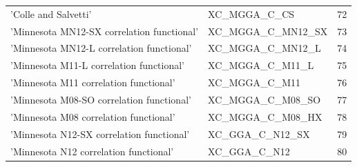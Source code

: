 \documentclass[final,12pt]{article}
\begin{document}
{{{{{{\begin{table}[!h]
\begin{center}
\begin{tabular}{llr}
  'Colle and Salvetti' & XC\_MGGA\_C\_CS  & 72\\
  'Minnesota MN12-SX correlation functional' & XC\_MGGA\_C\_MN12\_SX  & 73\\
  'Minnesota MN12-L correlation functional' & XC\_MGGA\_C\_MN12\_L  & 74\\
  'Minnesota M11-L correlation functional' & XC\_MGGA\_C\_M11\_L  & 75\\
  'Minnesota M11 correlation functional' & XC\_MGGA\_C\_M11  & 76\\
  'Minnesota M08-SO correlation functional' & XC\_MGGA\_C\_M08\_SO  & 77\\
  'Minnesota M08 correlation functional' & XC\_MGGA\_C\_M08\_HX  & 78\\
  'Minnesota N12-SX correlation functional' & XC\_GGA\_C\_N12\_SX  & 79\\
  'Minnesota N12 correlation functional' & XC\_GGA\_C\_N12  & 80\\
\hline
\hline
\end{tabular}
\end{center}
\end{table}

}}}}}}
\end{document}
